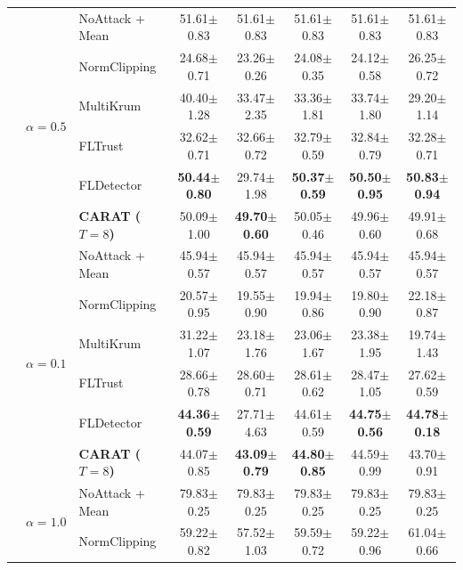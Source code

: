 \begin{table}[!t]
{\begin{tabular}{c c l c c c c c}
  & 
  & NoAttack + Mean & 51.61$\pm$0.83 & 51.61$\pm$0.83 & 51.61$\pm$0.83 & 51.61$\pm$0.83 & 51.61$\pm$0.83  \\
  & & NormClipping & 24.68$\pm$0.71 & 23.26$\pm$0.26 & 24.08$\pm$0.35 & 24.12$\pm$0.58 & 26.25$\pm$0.72 \\
  & & MultiKrum & 40.40$\pm$1.28 & 33.47$\pm$2.35 & 33.36$\pm$1.81 & 33.74$\pm$1.80 & 29.20$\pm$1.14 \\
  & & FLTrust & 32.62$\pm$0.71 & 32.66$\pm$0.72 & 32.79$\pm$0.59 & 32.84$\pm$0.79 & 32.28$\pm$0.71 \\
  & & FLDetector & \textbf{50.44$\pm$0.80} & 29.74$\pm$1.98 & \textbf{50.37$\pm$0.59} & \textbf{50.50$\pm$0.95} & \textbf{50.83$\pm$0.94} \\
  & & \textbf{CARAT ($T=8$)} & 50.09$\pm$1.00 & \textbf{49.70$\pm$0.60} & 50.05$\pm$0.46 & 49.96$\pm$0.60 & 49.91$\pm$0.68 \\
  \cmidrule(lr){2-8}
  & 
  & NoAttack + Mean & 45.94$\pm$0.57 & 45.94$\pm$0.57 & 45.94$\pm$0.57 & 45.94$\pm$0.57 & 45.94$\pm$0.57 \\
  & & NormClipping & 20.57$\pm$0.95 & 19.55$\pm$0.90 & 19.94$\pm$0.86 & 19.80$\pm$0.90 & 22.18$\pm$0.87 \\
  & & MultiKrum & 31.22$\pm$1.07 & 23.18$\pm$1.76 & 23.06$\pm$1.67 & 23.38$\pm$1.95 & 19.74$\pm$1.43 \\
  & & FLTrust & 28.66$\pm$0.78 & 28.60$\pm$0.71 & 28.61$\pm$0.62 & 28.47$\pm$1.05 & 27.62$\pm$0.59 \\
  & & FLDetector & \textbf{44.36$\pm$0.59} & 27.71$\pm$4.63 & 44.61$\pm$0.59 & \textbf{44.75$\pm$0.56} & \textbf{44.78$\pm$0.18} \\
  & & \textbf{CARAT ($T=8$)} & 44.07$\pm$0.85 & \textbf{43.09$\pm$0.79} & \textbf{44.80$\pm$0.85} & 44.59$\pm$0.99 & 43.70$\pm$0.91 \\
  \midrule
  & 
  & NoAttack + Mean & 79.83$\pm$0.25 & 79.83$\pm$0.25 & 79.83$\pm$0.25 & 79.83$\pm$0.25 & 79.83$\pm$0.25  \\
  & & NormClipping & 59.22$\pm$0.82 & 57.52$\pm$1.03 & 59.59$\pm$0.72 & 59.22$\pm$0.96 & 61.04$\pm$0.66 \\

\end{tabular}}
\end{table}
